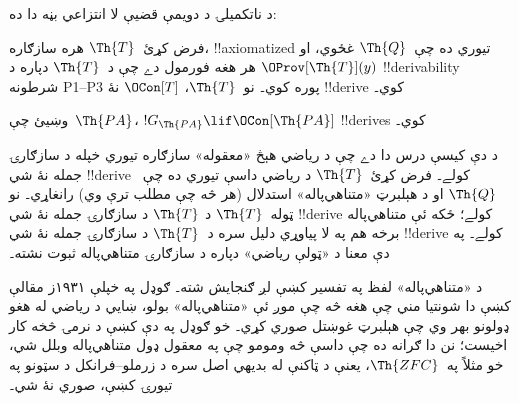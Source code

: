 \documentclass[../../../include/open-logic-section]{subfiles}
\begin{document}
د ناتکميلۍ د دويمې قضيې لا انتزاعي بڼه دا ده:

\begin{thm}
 فرض کړئ~$\Th{T}$ هره
سازګاره، !!{axiomatized} تيوري ده چې~$\Th{Q}$ غځوي، او
$\OProv[\Th{T}](y)$ هر هغه فورمول دے چې د~$\Th{T}$ دپاره د
!!{derivability} شرطونه P1--P3 پوره کوي۔ نو~$\Th{T}$،
$\OCon[T]$ نۀ !!{derive} کوي۔
\end{thm}

\begin{prob}
وښيئ چې~$\Th{PA}$، $!G_{\Th{PA}} \lif \OCon[\Th{PA}]$
!!{derive}s کوي۔
\end{prob}

\begin{digress}
د دې کيسې درس دا دے چې د رياضي هېڅ «معقوله» سازګاره تيوري
خپله د سازګارۍ جمله نۀ شي !!{derive} کولے۔ فرض کړئ~$\Th{T}$
د رياضي داسې تيوري ده چې~$\Th{Q}$ او د هېلبرټ «متناهي‌پاله»
استدلال (هر څه چې مطلب ترې وي) رانغاړي۔ نو ټوله~$\Th{T}$ د
$\Th{T}$ د سازګارۍ جمله نۀ شي !!{derive} کولے؛ ځکه ئې متناهي‌پاله
برخه هم په لا پياوړي دليل سره د~$\Th{T}$ د سازګارۍ جمله نۀ شي
!!{derive} کولے۔ په دې معنا د «ټولې رياضي» دپاره د سازګارۍ
متناهي‌پاله ثبوت نشته۔

د «متناهي‌پاله» لفظ په تفسير کښې لږ ګنجايش شته۔ ګوډل په خپلې
۱۹۳۱ز مقالې کښې دا شونتيا مني چې هغه څه چې موږ ئې «متناهي‌پاله»
بولو، ښايي د رياضي له هغو ډولونو بهر وي چې هېلبرټ غوښتل صوري
کړي۔ خو ګوډل په دې کښې د نرمۍ څخه کار اخيست؛ نن دا ګرانه ده چې
داسې څه ومومو چې په معقول ډول متناهي‌پاله وبلل شي، خو مثلاً
په~$\Th{ZFC}$، يعنې د ټاکنې له بديهي اصل سره د زرملو--فرانکل
د سټونو په تيورۍ کښې، صوري نۀ شي۔
\end{digress}
\end{document}
